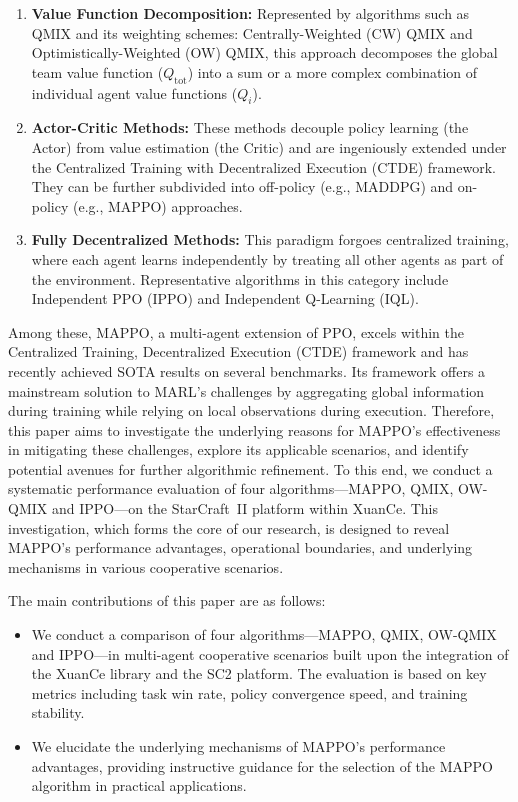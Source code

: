 \begin{enumerate}
    \item \textbf{Value Function Decomposition:} Represented by algorithms such as QMIX and its weighting schemes: Centrally-Weighted (CW) QMIX and Optimistically-Weighted (OW) QMIX, this approach decomposes the global team value function ($Q_{\text{tot}}$) into a sum or a more complex combination of individual agent value functions ($Q_i$).

    \item \textbf{Actor-Critic Methods:} These methods decouple policy learning (the Actor) from value estimation (the Critic) and are ingeniously extended under the Centralized Training with Decentralized Execution (CTDE) framework. They can be further subdivided into off-policy (e.g., MADDPG) and on-policy (e.g., MAPPO) approaches.

    \item \textbf{Fully Decentralized Methods:} This paradigm forgoes centralized training, where each agent learns independently by treating all other agents as part of the environment. Representative algorithms in this category include Independent PPO (IPPO) and Independent Q-Learning (IQL).
\end{enumerate}


Among these, MAPPO, a multi-agent extension of PPO, excels within the Centralized Training, 
Decentralized Execution (CTDE) framework and has recently achieved SOTA results on several benchmarks. 
Its framework offers a mainstream solution to MARL's challenges by aggregating global information 
during training while relying on local observations during execution.
Therefore, this paper aims to investigate the underlying reasons for MAPPO's effectiveness 
in mitigating these challenges, explore its applicable scenarios, and identify potential avenues for further algorithmic refinement. 
To this end, we conduct a systematic performance evaluation of four algorithms---MAPPO, QMIX, OW-QMIX and IPPO---on the StarCraft~II platform within XuanCe. 
This investigation, which forms the core of our research, is designed to reveal MAPPO's performance advantages, 
operational boundaries, and underlying mechanisms in various cooperative scenarios.


The main contributions of this paper are as follows:
\begin{itemize}
    \item We conduct a comparison of four algorithms---MAPPO, QMIX, OW-QMIX
    and IPPO---in multi-agent cooperative scenarios built upon the integration of the XuanCe library and the SC2 platform. 
    The evaluation is based on key metrics including task win rate, policy convergence speed, and training stability.

    \item We elucidate the underlying mechanisms of MAPPO's performance advantages, providing instructive 
    guidance for the selection of the MAPPO algorithm in practical applications.
\end{itemize}